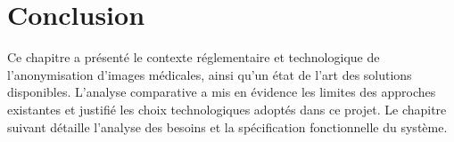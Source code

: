 \section*{Conclusion}
Ce chapitre a présenté le contexte réglementaire et technologique de l'anonymisation d'images médicales, ainsi qu'un état de l'art des solutions disponibles. L'analyse comparative a mis en évidence les limites des approches existantes et justifié les choix technologiques adoptés dans ce projet. Le chapitre suivant détaille l'analyse des besoins et la spécification fonctionnelle du système.
